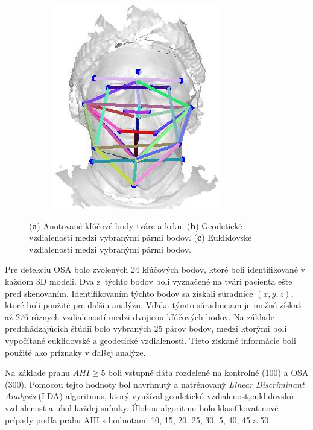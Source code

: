 \begin{figure}[h]
\begin{subfigure}[b]{0.21\textwidth}
		\includegraphics[width=\textwidth]{figures/resers_k.png}
		\caption{}
		\label{fig:resers:k}
	\end{subfigure}
	\caption{(\textbf{a}) Anotované kľúčové body tváre a krku. 
		(\textbf{b}) Geodetické vzdialenosti medzi vybranými pármi bodov.
		(\textbf{c}) Euklidovské vzdialenosti medzi vybranými pármi bodov. }
	\label{fig:resers:4}
\end{figure}

Pre detekciu OSA bolo zvolených 24 kľúčových bodov, ktoré boli identifikované v každom 3D modeli. 
Dva z týchto bodov boli vyznačené na tvári pacienta ešte pred skenovaním. Identifikovaním týchto bodov sa získali súradnice $(x,y,z)$, ktoré boli použité pre ďalšiu analýzu. Vďaka týmto súradniciam je možné získať až 276 rôznych vzdialeností medzi dvojicou kľúčových bodov.  Na základe predchádzajúcich štúdií bolo vybraných 25 párov bodov, medzi ktorými boli vypočítané euklidovské a geodetické vzdialenosti. Tieto získané informácie boli použité ako príznaky v ďalšej analýze. 

Na základe prahu $AHI\geq5$ boli vstupné dáta rozdelené na kontrolné (100) a OSA (300). Pomocou tejto hodnoty bol navrhnutý a natrénovaný \textit{Linear Discriminant Analysis} (LDA) algoritmus, ktorý využíval geodetickú vzdialenosť,euklidovskú vzdialenosť a uhol každej snímky. Úlohou algoritmu bolo klasifikovať nové prípady podľa prahu AHI s hodnotami 10, 15, 20, 25, 30, 5, 40, 45 a 50.

